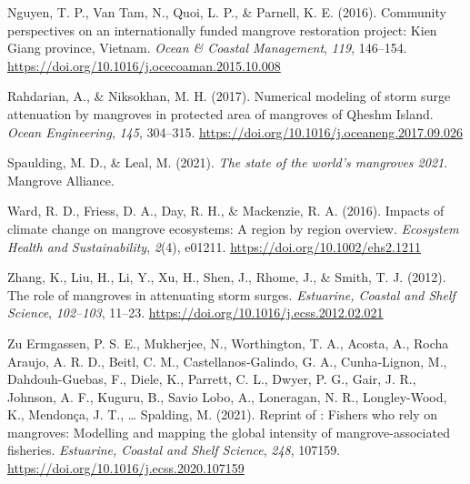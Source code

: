 \documentclass[
  12pt,
]{article}
\newlength{\cslhangindent}
\newenvironment{CSLReferences}[2] %
 {\begin{list}{}{%
  \setlength{\itemindent}{0pt}
  \setlength{\leftmargin}{0pt}
  \setlength{\parsep}{0pt}
  \ifodd #1
   \setlength{\leftmargin}{\cslhangindent}
   \setlength{\itemindent}{-1\cslhangindent}
  \fi
  \setlength{\itemsep}{#2\baselineskip}}}
 {\end{list}}
\begin{document}
\begin{CSLReferences}{1}{2}
Nguyen, T. P., Van Tam, N., Quoi, L. P., \& Parnell, K. E. (2016). Community perspectives on an internationally funded mangrove restoration project: {Kien Giang} province, {Vietnam}. \emph{Ocean \& Coastal Management}, \emph{119}, 146--154. \url{https://doi.org/10.1016/j.ocecoaman.2015.10.008}

Rahdarian, A., \& Niksokhan, M. H. (2017). Numerical modeling of storm surge attenuation by mangroves in protected area of mangroves of {Qheshm Island}. \emph{Ocean Engineering}, \emph{145}, 304--315. \url{https://doi.org/10.1016/j.oceaneng.2017.09.026}

Spaulding, M. D., \& Leal, M. (2021). \emph{The state of the world's mangroves 2021}. Mangrove Alliance.

Ward, R. D., Friess, D. A., Day, R. H., \& Mackenzie, R. A. (2016). Impacts of climate change on mangrove ecosystems: A region by region overview. \emph{Ecosystem Health and Sustainability}, \emph{2}(4), e01211. \url{https://doi.org/10.1002/ehs2.1211}

Zhang, K., Liu, H., Li, Y., Xu, H., Shen, J., Rhome, J., \& Smith, T. J. (2012). The role of mangroves in attenuating storm surges. \emph{Estuarine, Coastal and Shelf Science}, \emph{102--103}, 11--23. \url{https://doi.org/10.1016/j.ecss.2012.02.021}

Zu Ermgassen, P. S. E., Mukherjee, N., Worthington, T. A., Acosta, A., Rocha Araujo, A. R. D., Beitl, C. M., Castellanos-Galindo, G. A., Cunha-Lignon, M., Dahdouh-Guebas, F., Diele, K., Parrett, C. L., Dwyer, P. G., Gair, J. R., Johnson, A. F., Kuguru, B., Savio Lobo, A., Loneragan, N. R., Longley-Wood, K., Mendonça, J. T., \ldots{} Spalding, M. (2021). Reprint of : {Fishers} who rely on mangroves: {Modelling} and mapping the global intensity of mangrove-associated fisheries. \emph{Estuarine, Coastal and Shelf Science}, \emph{248}, 107159. \url{https://doi.org/10.1016/j.ecss.2020.107159}

\end{CSLReferences}
\end{document}

